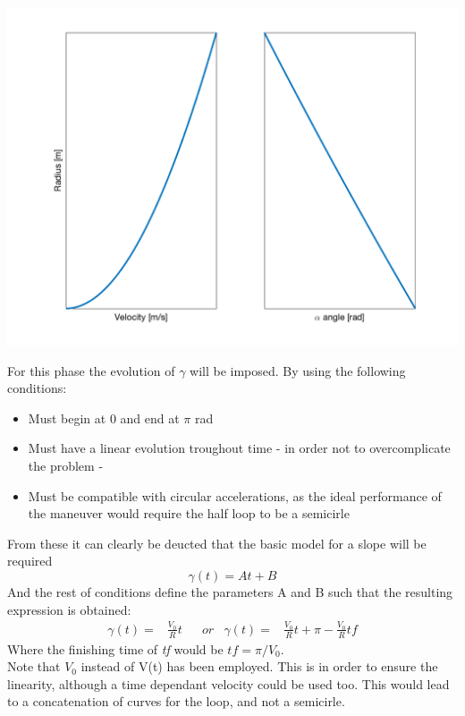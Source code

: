 \begin{center}
	\includegraphics[width=\linewidth]{../matlab/radius.png}
	\vspace{0.5cm}
	\vspace{0.25cm}
\end{center}

For this phase the evolution of $\gamma$ will be imposed. By using the following conditions:
\begin{itemize}
	\item Must begin at 0 and end at $\pi$ rad
	\item Must have a linear evolution troughout time - in order not to overcomplicate the problem -
	\item Must be compatible with circular accelerations, as the ideal performance of the maneuver would require the half loop to be a semicirle
\end{itemize}

From these it can clearly be deucted that the basic model for a slope will be required
\[\gamma(t)=At+B\]
And the rest of conditions define the parameters A and B such that the resulting expression is obtained:
\begin{align}
	\gamma(t)=&\frac{V_0}{R}t & &or& \gamma(t)=&\frac{V_0}{R}t + \pi-\frac{V_0}{R}tf 
\end{align}
Where the finishing time of \textit{tf} would be $tf=\pi/V_0$.\\
Note that $V_0$ instead of V(t) has been employed. This is in order to ensure the linearity, although a time dependant velocity could be used too. This would lead to a concatenation of curves for the loop, and not a semicirle.\\

